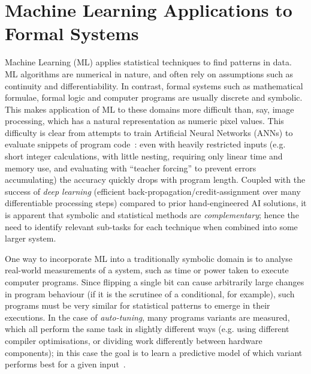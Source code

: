 \section{Machine Learning Applications to Formal Systems}

Machine Learning (ML) applies statistical techniques to find patterns in data.
ML algorithms are numerical in nature, and often rely on assumptions such as
continuity and differentiability. In contrast, formal systems such as
mathematical formulae, formal logic and computer programs are usually discrete
and symbolic. This makes application of ML to these domains more difficult than,
say, image processing, which has a natural representation as numeric pixel
values. This difficulty is clear from attempts to train Artificial Neural
Networks (ANNs) to evaluate snippets of program code~\cite{zaremba2014learning}:
even with heavily restricted inputs (e.g. short integer calculations, with
little nesting, requiring only linear time and memory use, and evaluating with
``teacher forcing'' to prevent errors accumulating) the accuracy quickly drops
with program length. Coupled with the success of \emph{deep learning} (efficient
back-propagation/credit-assignment over many differentiable processing steps)
compared to prior hand-engineered AI solutions, it is apparent that symbolic
and statistical methods are \emph{complementary}; hence the need to identify
relevant sub-tasks for each technique when combined into some larger system.

One way to incorporate ML into a traditionally symbolic domain is to analyse
real-world measurements of a system, such as time or power taken to execute
computer programs. Since flipping a single bit can cause arbitrarily large
changes in program behaviour (if it is the scrutinee of a conditional, for
example), such programs must be very similar for statistical patterns to emerge
in their executions. In the case of \emph{auto-tuning}, many programs variants
are measured, which all perform the same task in slightly different ways (e.g.
using different compiler optimisations, or dividing work differently between
hardware components); in this case the goal is to learn a predictive model of
which variant performs best for a given input~\cite{ganapathi2009case}.

